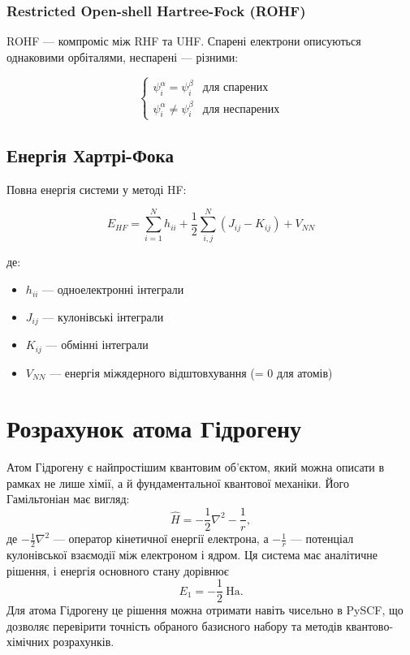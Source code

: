 \subsubsection{Restricted Open-shell Hartree-Fock (ROHF)}

ROHF --- компроміс між RHF та UHF. Спарені електрони описуються однаковими орбіталями, неспарені --- різними:

\begin{equation}
    \begin{cases}
        \psi_i^\alpha = \psi_i^\beta    & \text{для спарених}   \\
        \psi_i^\alpha \neq \psi_i^\beta & \text{для неспарених}
    \end{cases}
\end{equation}

\subsection{Енергія Хартрі-Фока}

Повна енергія системи у методі HF:

\begin{equation}
    E_{HF} = \sum_{i=1}^{N} h_{ii} + \frac{1}{2} \sum_{i,j}^{N} (J_{ij} - K_{ij}) + V_{NN}
\end{equation}

де:
\begin{itemize}
    \item $h_{ii}$ --- одноелектронні інтеграли
    \item $J_{ij}$ --- кулонівські інтеграли
    \item $K_{ij}$ --- обмінні інтеграли
    \item $V_{NN}$ --- енергія міжядерного відштовхування (= 0 для атомів)
\end{itemize}


\section{Розрахунок атома Гідрогену}

Атом Гідрогену є найпростішим квантовим об'єктом, який можна описати в рамках не лише хімії, а й фундаментальної квантової механіки. Його Гамільтоніан має вигляд:
\[
    \hat{H} = -\frac{1}{2}\nabla^2 - \frac{1}{r},
\]
де \(-\frac{1}{2}\nabla^2\) --- оператор кінетичної енергії електрона, а \(-\frac{1}{r}\) --- потенціал кулонівської взаємодії між електроном і ядром.
Ця система має аналітичне рішення, і енергія основного стану дорівнює
\[
    E_1 = -\frac{1}{2}\ \text{Ha}.
\]
Для атома Гідрогену це рішення можна отримати навіть чисельно в PySCF, що дозволяє перевірити точність обраного базисного набору та методів квантово-хімічних розрахунків.


